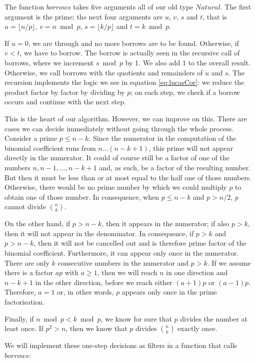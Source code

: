 \documentclass[tikz]{scrreprt}
\newcommand{\Conid}[1]{\mathit{#1}}
\newcommand{\Varid}[1]{\mathit{#1}}
\begin{document}
The function \ensuremath{\Varid{borrows}} takes five arguments
all of our old type \ensuremath{\Conid{Natural}}.
The first argument is the prime;
the next four arguments are $u$, $v$, $s$ and $t$,
that is 
$u = \lfloor n/p \rfloor$,
$v = n \bmod p$,
$s = \lfloor k/p \rfloor$ and
$t = k \bmod p$.

If $u=0$, we are through and no more borrows
are to be found.
Otherwise, if $v < t$, we have to borrow.
The borrow is actually seen in the recursive
call of borrows, where we increment $s \bmod p$ by 1.
We also add 1 to the overall result.
Otherwise, we call borrows with the quotients
and remainders of $u$ and $s$.
The recursion implements the logic we see
in equation \ref{eq:lucasCor}:
we reduce the product factor by factor
by dividing by $p$;
on each step, we check if a borrow occurs
and continue with the next step.

This is the heart of our algorithm.
However, we can improve on this.
There are cases we can decide 
immediately without going through 
the whole process.
Consider a prime $p \le n-k$.
Since the numerator in the computation
of the binomial coefficient
runs from $n\dots (n-k+1)$,
this prime will not appear directly
in the numerator. It could of course
still be a factor of one of the numbers
$n,n-1,\dots,n-k+1$ and, as such, be
a factor of the resulting number. But then it
must be less than or at most equal to
the half one of those numbers. Otherwise,
there would be no prime number by which
we could multiply $p$ to obtain one
of those number.
In consequence, when $p \le n-k$ and
$p > n/2$, $p$ cannot divide $\binom{n}{k}$.

On the other hand, if $p > n-k$,
then it appears in the numerator;
if also $p > k$, then it will not
appear in the denominator.
In consequence, if $p > k$ and $p > n-k$,
then it will not be cancelled out
and is therefore prime factor of
the binomial coefficient.
Furthermore,
it can appear only once in the numerator.
There are only $k$ consecutive numbers
in the numerator and $p > k$.
If we assume there is a factor
$ap$ with $a \ge 1$, then 
we will reach $n$ in one direction
and $n-k+1$ in the other direction,
before we reach either $(a+1)p$ or $(a-1)p$.
Therefore, $a=1$ or, in other words,
$p$ appears only once
in the prime factorisation.

Finally, if $n \bmod p < k \bmod p$,
we know for sure that $p$ divides
the number at least once.
If $p^2 > n$, then we know
that $p$ divides $\binom{n}{k}$
exactly once.

We will implement these one-step decisions
as filters in a function that calls \ensuremath{\Varid{borrows}}:
\end{document}
